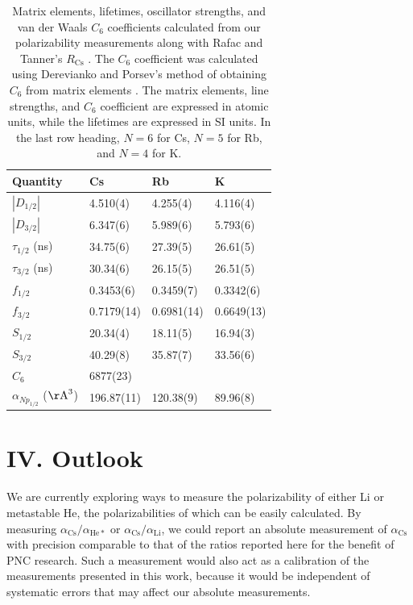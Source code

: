 \documentclass[twocolumn,prl,showpacs,superscriptaddress]{revtex4-1}   %
\newcommand{\acs}{\alpha_{\textrm{Cs}}}
\newcommand{\AAA}{\mathrm{\AA}}
\begin{document}
\begingroup
\begin{table}
\caption{\label{tableMisc}Matrix elements, lifetimes, oscillator strengths, and van der Waals $C_6$ coefficients calculated from our polarizability measurements along with Rafac and Tanner's $R_{\mathrm{Cs}}$ \cite{Rafac1998}. The $C_6$ coefficient was calculated using Derevianko and Porsev's method of obtaining $C_6$ from matrix elements \cite{Derevianko2001}. The matrix elements, line strengths, and $C_6$ coefficient are expressed in atomic units, while the lifetimes are expressed in SI units. In the last row heading, $N=6$ for Cs, $N=5$ for Rb, and $N=4$ for K.}
\begin{center}
\begin{tabular}{l l l l}
\hline\hline
Quantity & Cs & Rb & K \\
\hline
$\left|D_{1/2}\right|$	& 4.510(4) & 4.255(4) & 4.116(4) \\
$\left|D_{3/2}\right|$	& 6.347(6) & 5.989(6) & 5.793(6) \\
$\tau_{1/2}$ (ns)		& 34.75(6) & 27.39(5) & 26.61(5) \\
$\tau_{3/2}$ (ns)		& 30.34(6) & 26.15(5) & 26.51(5) \\
$f_{1/2}$				& 0.3453(6) & 0.3459(7) & 0.3342(6) \\
$f_{3/2}$				& 0.7179(14) & 0.6981(14) & 0.6649(13) \\
$S_{1/2}$ 				& 20.34(4) & 18.11(5) & 16.94(3) \\
$S_{3/2}$ 				& 40.29(8) & 35.87(7) & 33.56(6) \\
$C_6$					& 6877(23) & & \\
$\alpha_{Np_{1/2}}$ ($\AAA^3$)		& 196.87(11) & 120.38(9) & 89.96(8) \\
\hline\hline
\end{tabular}
\end{center}
\end{table}
\endgroup

\section{IV. Outlook}

We are currently exploring ways to measure the polarizability of either Li or metastable He, the polarizabilities of which can be easily calculated. By measuring $\acs/\alpha_{\mathrm{He*}}$ or $\acs/\alpha_{\mathrm{Li}}$, we could report an absolute measurement of $\acs$ with precision comparable to that of the ratios reported here for the benefit of PNC research. Such a measurement would also act as a calibration of the measurements presented in this work, because it would be independent of systematic errors that may affect our absolute measurements.
\end{document}
